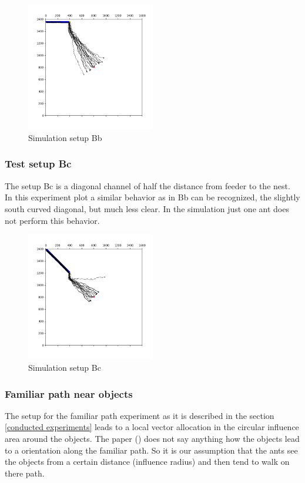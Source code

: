 \documentclass[11pt]{article}
\begin{document}
\begin{figure}[H]
	\centering
	\includegraphics[width=0.5\textwidth]{test_Bb.png}
	\caption{Simulation setup Bb}
	\label{fig:Bb}
\end{figure}

	\subsubsection{Test setup Bc}
The setup Bc is a diagonal channel of half the distance from feeder to the nest. \\
In this experiment plot a similar behavior as in Bb can be recognized, the slightly south curved diagonal, but much less clear. In the simulation just one ant does not perform this behavior.

\begin{figure}[H]
	\centering
	\includegraphics[width=0.5\textwidth]{test_Bc.png}
	\caption{Simulation setup Bc}
	\label{fig:Bc}
\end{figure}

	\subsubsection{Familiar path near objects}
The setup for the familiar path experiment as it is described in the section \ref{conducted experiments} leads to a local vector allocation in the circular influence area around the objects. The paper (\cite{wehner}) does not say anything how the objects lead to a orientation along the familiar path. So it is our assumption that the ants see the objects from a certain distance (influence radius) and then tend to walk on there path. \\
\end{document}

